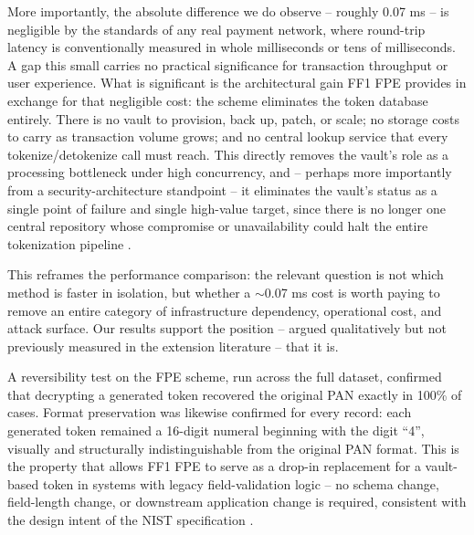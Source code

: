 \documentclass[conference]{IEEEtran}
\begin{document}
More importantly, the absolute difference we do observe -- roughly 0.07 ms -- is negligible by the standards of any real payment network, where round-trip latency is conventionally measured in whole milliseconds or tens of milliseconds. A gap this small carries no practical significance for transaction throughput or user experience. What is significant is the architectural gain FF1 FPE provides in exchange for that negligible cost: the scheme eliminates the token database entirely. There is no vault to provision, back up, patch, or scale; no storage costs to carry as transaction volume grows; and no central lookup service that every tokenize/detokenize call must reach. This directly removes the vault's role as a processing bottleneck under high concurrency, and -- perhaps more importantly from a security-architecture standpoint -- it eliminates the vault's status as a single point of failure and single high-value target, since there is no longer one central repository whose compromise or unavailability could halt the entire tokenization pipeline \cite{b1,b2,b3}.

This reframes the performance comparison: the relevant question is not which method is faster in isolation, but whether a $\sim$0.07 ms cost is worth paying to remove an entire category of infrastructure dependency, operational cost, and attack surface. Our results support the position -- argued qualitatively but not previously measured in the extension literature \cite{b2,b3} -- that it is.

A reversibility test on the FPE scheme, run across the full dataset, confirmed that decrypting a generated token recovered the original PAN exactly in 100\% of cases. Format preservation was likewise confirmed for every record: each generated token remained a 16-digit numeral beginning with the digit ``4'', visually and structurally indistinguishable from the original PAN format. This is the property that allows FF1 FPE to serve as a drop-in replacement for a vault-based token in systems with legacy field-validation logic -- no schema change, field-length change, or downstream application change is required, consistent with the design intent of the NIST specification \cite{b4}.
\end{document}
